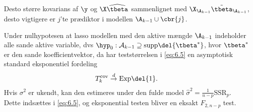 Desto større kovarians af \(\y\) og \(\X \widehat{\tbeta}\) sammenlignet med \(\X_{\A_{k-1}} \tilde{\tbeta}_{\A_{k-1}}\), desto vigtigere er \(j\)'te prædiktor i modellen \(\A_{k-1} \cup \cbr{j}\).

Under nulhypotesen at lasso modellen med den aktive mængde \(\A_{k-1}\) indeholder alle sande aktive variable, dvs \(\hyp_0: \mathcal{A}_{k-1} \supseteq \text{supp} \del{\tbeta^*}\), hvor \(\tbeta^*\) er den sande koefficientvektor, da har teststørrelsen i \eqref{eq:6.5} en asymptotisk standard eksponentiel fordeling
\begin{align*}
T_k^\text{cov} \overset{d}{\rightarrow} \text{Exp}\del{1}.
\end{align*}
Hvis \(\sigma^2\) er ukendt, kan den estimeres under den fulde model \(\widehat{\sigma}^2 = \frac{1}{n-p} \text{SSR}_p\). 
Dette indsættes i \eqref{eq:6.5}, og eksponential testen bliver en eksakt \(F_{2,n-p}\) test.

